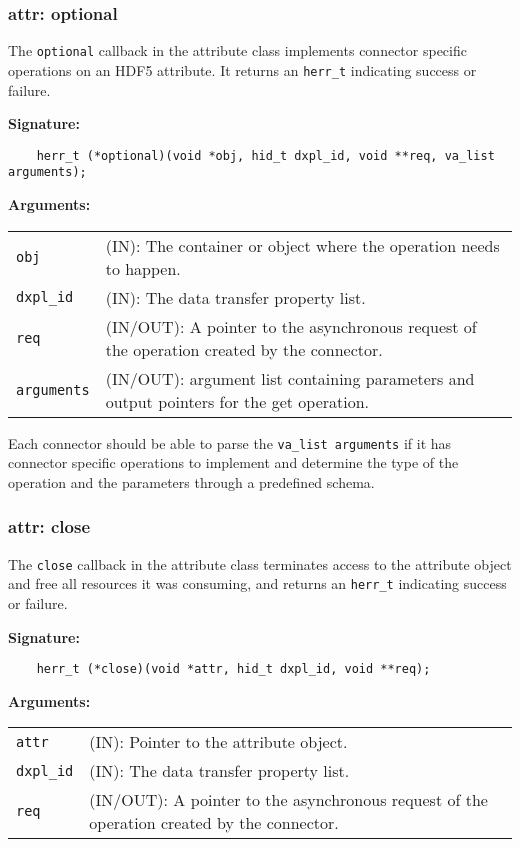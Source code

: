 \subsubsection{attr: optional}
The \texttt{optional} callback in the attribute class implements connector specific operations on an HDF5 attribute. It returns an \texttt{herr\_t} indicating success or failure. \bigskip

\begin{mdframed}[style=bgbox]
\textbf{Signature:}
\begin{lstlisting}
    herr_t (*optional)(void *obj, hid_t dxpl_id, void **req, va_list arguments);
\end{lstlisting}

\textbf{Arguments:}\\
\begin{tabular}{l p{13.5cm}}
  \texttt{obj} & (IN): The container or object where the operation needs to happen.\\
  \texttt{dxpl\_id} & (IN): The data transfer property list.\\
  \texttt{req} & (IN/OUT): A pointer to the asynchronous request of the operation created by the connector.\\
  \texttt{arguments} & (IN/OUT): argument list containing parameters and output pointers for the get operation. \\
\end{tabular}
\end{mdframed}

Each connector should be able to parse the \texttt{va\_list arguments} if it has connector specific operations to implement and determine the type of the operation and the parameters through a predefined schema. 

\subsubsection{attr: close}
The \texttt{close} callback in the attribute class terminates
access to the attribute object and free all resources it was
consuming, and returns an \texttt{herr\_t} indicating success or failure.\bigskip

\begin{mdframed}[style=bgbox]
\textbf{Signature:}
\begin{lstlisting}
    herr_t (*close)(void *attr, hid_t dxpl_id, void **req);
\end{lstlisting}

\textbf{Arguments:}\\
\begin{tabular}{l p{13.5cm}}
  \texttt{attr} & (IN): Pointer to the attribute object.\\
  \texttt{dxpl\_id} & (IN): The data transfer property list.\\
  \texttt{req} & (IN/OUT): A pointer to the asynchronous request of the
  operation created by the connector.\\
\end{tabular}
\end{mdframed}

